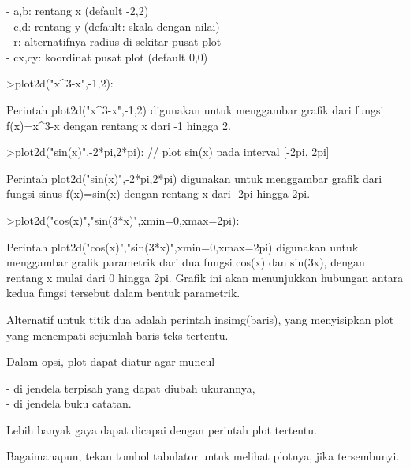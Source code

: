 \documentclass{article}
\begin{document}
\begin{eulernotebook}
\begin{eulercomment}
\begin{eulercomment}
\begin{eulercomment}
\begin{eulercomment}
\begin{eulercomment}
\begin{eulercomment}
\begin{eulercomment}
- a,b: rentang x (default -2,2)\\
- c,d: rentang y (default: skala dengan nilai)\\
- r: alternatifnya radius di sekitar pusat plot\\
- cx,cy: koordinat pusat plot (default 0,0)
\end{eulercomment}
\begin{eulerprompt}
>plot2d("x^3-x",-1,2):
\end{eulerprompt}
\begin{eulercomment}
Perintah plot2d("x\textasciicircum{}3-x",-1,2) digunakan untuk menggambar grafik dari
fungsi f(x)=x\textasciicircum{}3-x dengan rentang x dari -1 hingga 2.
\end{eulercomment}
\begin{eulerprompt}
>plot2d("sin(x)",-2*pi,2*pi): // plot sin(x) pada interval [-2pi, 2pi]
\end{eulerprompt}
\begin{eulercomment}
Perintah plot2d("sin(x)",-2*pi,2*pi) digunakan untuk menggambar grafik
dari fungsi sinus f(x)=sin(x) dengan rentang x dari -2pi hingga 2pi.
\end{eulercomment}
\begin{eulerprompt}
>plot2d("cos(x)","sin(3*x)",xmin=0,xmax=2pi):
\end{eulerprompt}
\begin{eulercomment}
Perintah plot2d("cos(x)","sin(3*x)",xmin=0,xmax=2pi) digunakan untuk
menggambar grafik parametrik dari dua fungsi cos(x) dan sin(3x),
dengan rentang x mulai dari 0 hingga 2pi. Grafik ini akan menunjukkan
hubungan antara kedua fungsi tersebut dalam bentuk parametrik.

Alternatif untuk titik dua adalah perintah insimg(baris), yang
menyisipkan plot yang menempati sejumlah baris teks tertentu.

Dalam opsi, plot dapat diatur agar muncul

- di jendela terpisah yang dapat diubah ukurannya,\\
- di jendela buku catatan.

Lebih banyak gaya dapat dicapai dengan perintah plot tertentu.

Bagaimanapun, tekan tombol tabulator untuk melihat plotnya, jika
tersembunyi.


\end{eulercomment}
\end{eulercomment}
\end{eulercomment}
\end{eulercomment}
\end{eulercomment}
\end{eulercomment}
\end{eulercomment}
\end{eulernotebook}
\end{document}
